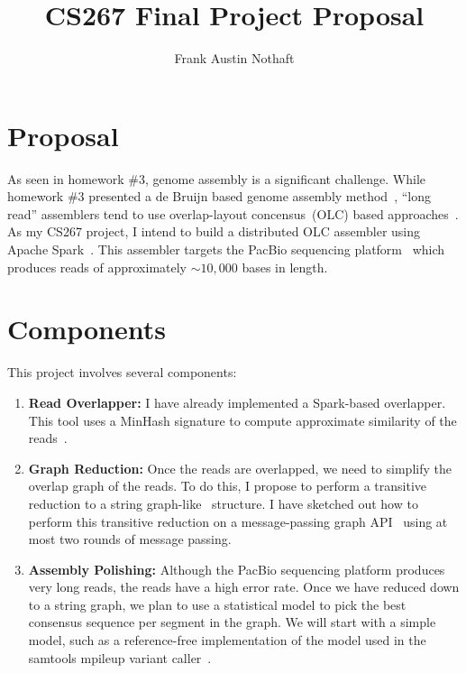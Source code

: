 \documentclass[11pt]{article}
\begin{document}
\title{CS267 Final Project Proposal}
\author{Frank Austin Nothaft}
\date{}

\maketitle

\section{Proposal}

As seen in homework \#3, genome assembly is a significant challenge. While homework \#3
presented a de Bruijn based genome assembly method~\cite{pevzner01}, ``long read'' assemblers
tend to use overlap-layout concensus~(OLC) based approaches~\cite{rausch09}. As my CS267 project,
I intend to build a distributed OLC assembler using Apache Spark~\cite{zaharia10}. This
assembler targets the PacBio sequencing platform~\cite{eid09} which produces reads of approximately
$\sim10,000$ bases in length.

\section{Components}

This project involves several components:

\begin{enumerate}
\item \textbf{Read Overlapper:} I have already implemented a Spark-based overlapper. This tool uses
a MinHash signature to compute approximate similarity of the reads~\cite{berlin14}.
\item \textbf{Graph Reduction:} Once the reads are overlapped, we need to simplify the overlap graph
of the reads. To do this, I propose to perform a transitive reduction to a string graph-like~\cite{myers05}
structure. I have sketched out how to perform this transitive reduction on a message-passing graph
API~\cite{gonzalez14} using at most two rounds of message passing.
\item \textbf{Assembly Polishing:} Although the PacBio sequencing platform produces very long reads,
the reads have a high error rate. Once we have reduced down to a string graph, we plan to use a statistical
model to pick the best consensus sequence per segment in the graph. We will start with a simple model, such
as a reference-free implementation of the model used in the samtools mpileup variant caller~\cite{li11}.
\end{enumerate}
\end{document}
